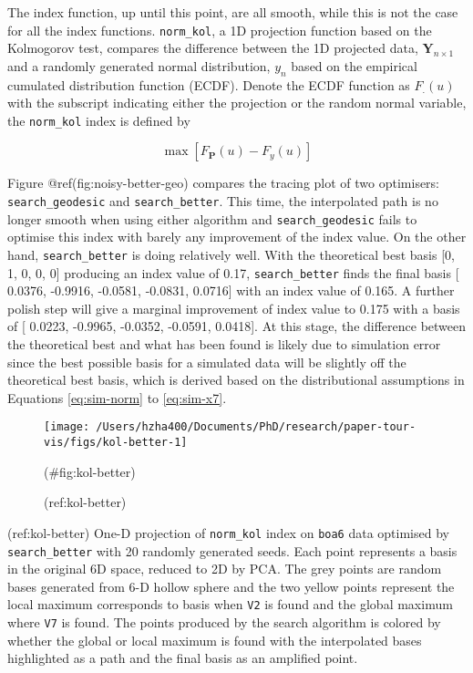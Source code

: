 The index function, up until this point, are all smooth, while this is not the case for all the index functions. \texttt{norm\_kol}, a 1D projection function based on the Kolmogorov test, compares the difference between the 1D projected data, \(\mathbf{Y}_{n \times 1}\) and a randomly generated normal distribution, \(y_n\) based on the empirical cumulated distribution function (ECDF). Denote the ECDF function as \(F_{.}(u)\) with the subscript indicating either the projection or the random normal variable, the \texttt{norm\_kol} index is defined by

\[\max \left[F_{\mathbf{P}}(u) - F_{y}(u)\right]\]

Figure @ref(fig:noisy-better-geo) compares the tracing plot of two optimisers: \texttt{search\_geodesic} and \texttt{search\_better}. This time, the interpolated path is no longer smooth when using either algorithm and \texttt{search\_geodesic} fails to optimise this index with barely any improvement of the index value. On the other hand, \texttt{search\_better} is doing relatively well. With the theoretical best basis {[}0, 1, 0, 0, 0{]} producing an index value of 0.17, \texttt{search\_better} finds the final basis {[} 0.0376, -0.9916, -0.0581, -0.0831, 0.0716{]} with an index value of 0.165. A further polish step will give a marginal improvement of index value to 0.175 with a basis of {[} 0.0223, -0.9965, -0.0352, -0.0591, 0.0418{]}. At this stage, the difference between the theoretical best and what has been found is likely due to simulation error since the best possible basis for a simulated data will be slightly off the theoretical best basis, which is derived based on the distributional assumptions in Equations \ref{eq:sim-norm} to \ref{eq:sim-x7}.

\begin{Schunk}
\begin{figure}

{\centering \texttt{[image: /Users/hzha400/Documents/PhD/research/paper-tour-vis/figs/kol-better-1]} 

}

\caption[(ref:kol-better)]{(ref:kol-better)}(\#fig:kol-better)
\end{figure}
\end{Schunk}

(ref:kol-better) One-D projection of \texttt{norm\_kol} index on \texttt{boa6} data optimised by \texttt{search\_better} with 20 randomly generated seeds. Each point represents a basis in the original 6D space, reduced to 2D by PCA. The grey points are random bases generated from 6-D hollow sphere and the two yellow points represent the local maximum corresponds to basis when \texttt{V2} is found and the global maximum where \texttt{V7} is found. The points produced by the search algorithm is colored by whether the global or local maximum is found with the interpolated bases highlighted as a path and the final basis as an amplified point.

